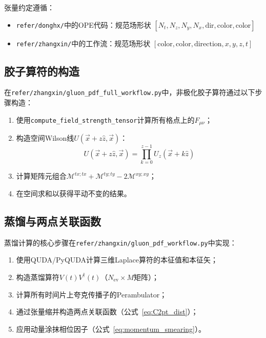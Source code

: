 \documentclass[12pt,a4paper]{ctexart}
\theoremstyle{definition}
\begin{document}
张量约定遵循：
\begin{itemize}
    \item \texttt{refer/donghx/}中的OPE代码：规范场形状 $[N_t, N_z, N_y, N_x, \text{dir}, \text{color}, \text{color}]$
    \item \texttt{refer/zhangxin/}中的工作流：规范场形状 $[\text{color}, \text{color}, \text{direction}, x, y, z, t]$
\end{itemize}

\subsection{胶子算符的构造}

在\texttt{refer/zhangxin/gluon\_pdf\_full\_workflow.py}中，非极化胶子算符通过以下步骤构造：

\begin{enumerate}
    \item 使用\texttt{compute\_field\_strength\_tensor}计算所有格点上的$F_{\mu\nu}$；
    \item 构造空间Wilson线$U(\vec{x}+z\hat{z}, \vec{x})$：
    \begin{equation}
        U(\vec{x}+z\hat{z}, \vec{x}) = \prod_{k=0}^{z-1} U_z(\vec{x}+k\hat{z})
    \end{equation}
    \item 计算矩阵元组合$\mathcal{M}^{tx;tx} + \mathcal{M}^{ty;ty} - 2\mathcal{M}^{xy;xy}$；
    \item 在空间求和以获得平动不变的结果。
\end{enumerate}

\subsection{蒸馏与两点关联函数}

蒸馏计算的核心步骤在\texttt{refer/zhangxin/gluon\_pdf\_workflow.py}中实现：

\begin{enumerate}
    \item 使用QUDA/PyQUDA计算三维Laplace算符的本征值和本征矢；
    \item 构造蒸馏算符$V(t) V^\dagger(t)$（$N_{\text{ev}} \times M$矩阵）；
    \item 计算所有时间片上夸克传播子的Perambulator；
    \item 通过张量缩并构造两点关联函数（公式~\ref{eq:C2pt_dist}）；
    \item 应用动量涂抹相位因子（公式~\ref{eq:momentum_smearing}）。
\end{enumerate}
\end{document}
